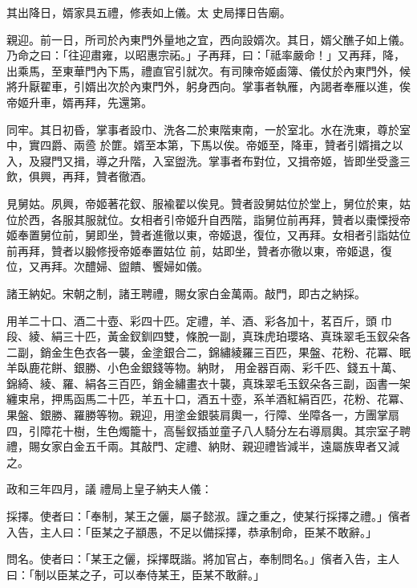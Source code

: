 \begin{pinyinscope}
 其出降日，婿家具五禮，修表如上儀。太
 史局擇日告廟。



 親迎。前一日，所司於內東門外量地之宜，西向設婿次。其日，婿父醮子如上儀。乃命之曰：「往迎肅雍，以昭惠宗祏。」子再拜，曰：「祗率嚴命！」又再拜，降，出乘馬，至東華門內下馬，禮直官引就次。有司陳帝姬鹵簿、儀仗於內東門外，候將升厭翟車，引婿出次於內東門外，躬身西向。掌事者執雁，內謁者奉雁以進，俟帝姬升車，婿再拜，先還第。



 同牢。其日初昏，掌事者設巾、洗各二於東階東南，一於室北。水在洗東，尊於室中，實四爵、兩巹
 於篚。婿至本第，下馬以俟。帝姬至，降車，贊者引婿揖之以入，及寢門又揖，導之升階，入室盥洗。掌事者布對位，又揖帝姬，皆即坐受盞三飲，俱興，再拜，贊者徹酒。



 見舅姑。夙興，帝姬著花釵、服褕翟以俟見。贊者設舅姑位於堂上，舅位於東，姑位於西，各服其服就位。女相者引帝姬升自西階，詣舅位前再拜，贊者以棗慄授帝姬奉置舅位前，舅即坐，贊者進徹以東，帝姬退，復位，又再拜。女相者引詣姑位前再拜，贊者以腶修授帝姬奉置姑位
 前，姑即坐，贊者亦徹以東，帝姬退，復位，又再拜。次醴婦、盥饋、饗婦如儀。



 諸王納妃。宋朝之制，諸王聘禮，賜女家白金萬兩。敲門，即古之納採。


用羊二十口、酒二十壺、彩四十匹。定禮，羊、酒、彩各加十，茗百斤，頭
 巾段、綾、絹三十匹，黃金釵釧四雙，條脫一副，真珠虎珀瓔珞、真珠翠毛玉釵朵各二副，銷金生色衣各一襲，金塗銀合二，錦繡綾羅三百匹，果盤、花粉、花冪、眠羊臥鹿花餅、銀勝、小色金銀錢等物。納財，
 用金器百兩、彩千匹、錢五十萬、錦綺、綾、羅、絹各三百匹，銷金繡畫衣十襲，真珠翠毛玉釵朵各三副，函書一架纏束帛，押馬函馬二十匹，羊五十口，酒五十壺，系羊酒紅絹百匹，花粉、花冪、果盤、銀勝、羅勝等物。親迎，用塗金銀裝肩輿一，行障、坐障各一，方團掌扇四，引障花十樹，生色燭籠十，高髻釵插並童子八人騎分左右導扇輿。其宗室子聘禮，賜女家白金五千兩。其敲門、定禮、納財、親迎禮皆減半，遠屬族卑者又減之。



 政和三年四月，議
 禮局上皇子納夫人儀：



 採擇。使者曰：「奉制，某王之儷，屬子懿淑。謹之重之，使某行採擇之禮。」儐者入告，主人曰：「臣某之子顓愚，不足以備採擇，恭承制命，臣某不敢辭。」



 問名。使者曰：「某王之儷，採擇既諧。將加官占，奉制問名。」儐者入告，主人曰：「制以臣某之子，可以奉侍某王，臣某不敢辭。」




\end{pinyinscope}
